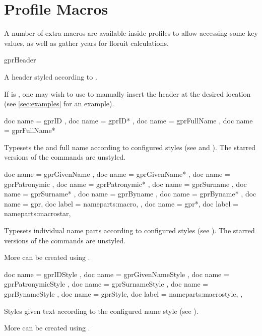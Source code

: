 \documentclass[
	a4paper,
]{article}
\begin{document}
\section{Profile Macros} %
\label{sec:promac}

A number of extra macros are available inside profiles to allow accessing some key values, as well as gather years for floruit calculations.

\begin{docCommand}
	{gprHeader}
	{\brackets{}}

	A header styled according to .

	If  is , one may wish to use  to manually insert the header at the desired location (see \cref{sec:examples} for an example).

\end{docCommand}


\begin{docCommands}[
		doc parameter = {\brackets{}}
	]
	{
		{ doc name = gprID },
		{ doc name = gprID* },
		{ doc name = gprFullName },
		{ doc name = gprFullName* }
	}

	Typesets the  and full name according to configured styles (see  and ). The starred versions of the commands are unstyled.

\end{docCommands}


\begin{docCommands}[
		doc parameter = {\brackets{}}
	]
	{
		{ doc name = gprGivenName },
		{ doc name = gprGivenName* },
		{ doc name = gprPatronymic },
		{ doc name = gprPatronymic* },
		{ doc name = gprSurname },
		{ doc name = gprSurname* },
		{ doc name = gprByname },
		{ doc name = gprByname* },
		{
			doc name = gpr,
			doc label = nameparts:macro,
		} ,
		{
			doc name = gpr*,
			doc label = nameparts:macrostar,
		}
	}

	Typesets individual name parts according to configured styles (see ). The starred versions of the commands are unstyled.

	More can be created using .
\end{docCommands}


\begin{docCommands}[
		doc parameter = {\marg{text}}
	]
	{
		{ doc name = gprIDStyle },
		{ doc name = gprGivenNameStyle },
		{ doc name = gprPatronymicStyle },
		{ doc name = gprSurnameStyle },
		{ doc name = gprBynameStyle },
		{
			doc name = gprStyle,
			doc label = nameparts:macrostyle,
		},
	}

	Styles given text according to the configured name style (see ).

	More can be created using .
\end{docCommands}
\end{document}

